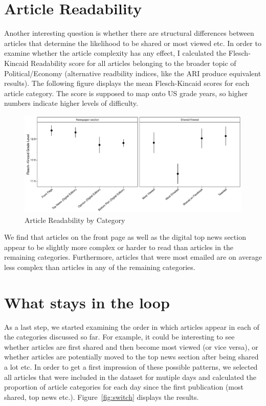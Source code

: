 \documentclass[12pt]{article}
\begin{document}
\begin{doublespace}
\section{Article Readability}

Another interesting question is whether there are structural differences between articles that determine the likelihood to be shared or most viewed etc. In order to examine whether the article complexity has any effect, I calculated the Flesch-Kincaid Readability score for all articles belonging to the broader topic of Political/Economy (alternative readbility indices, like the ARI produce equivalent results). The following figure displays the mean Flesch-Kincaid scores for each article category. The score is supposed to map onto US grade years, so higher numbers indicate higher levels of difficulty.

\begin{figure}
\caption{Article Readability by Category}\label{fig:readability}
\includegraphics[width=\textwidth]{../calc/fig/readability} 
\end{figure}

We find that articles on the front page as well as the digital top news section appear to be slightly more complex or harder to read than articles in the remaining categories. Furthermore, articles that were most emailed are on average less complex than articles in any of the remaining categories.


\section{What stays in the loop}

As a last step, we started examining the order in which articles appear in each of the categories discussed so far. For example, it could be interesting to see whether articles are first shared and then become most viewed (or vice versa), or whether articles are potentially moved to the top news section after being shared a lot etc. In order to get a first impression of these possible patterns, we selected all articles that were included in the dataset for mutiple days and calculated the proportion of article categories for each day since the first publication (most shared, top news etc.). Figure~\ref{fig:switch} displays the results.


\end{doublespace}
\end{document}
